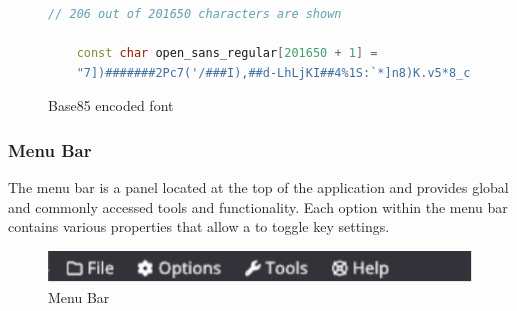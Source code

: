 \documentclass[11pt]{article}
\begin{document}
\begin{figure}[H]
  \centering
  \begin{lstlisting}[language=C++]
    // 206 out of 201650 characters are shown

    const char open_sans_regular[201650 + 1] =
    "7])#######2Pc7('/###I),##d-LhLjKI##4%1S:`*]n8)K.v5*8_c)iZ;99=$$$$c(m]4pKdp/(RdL<snZo'oI,hLNDnx4Uu/>8Q7oo^eFb3hB4JYc'Tx-3l_wgd2Tf._r+&sAqV,-G"":F8LD=5,n]A&aA+<gXG-<iobW&>$>QJ8Z.W$jg0Fv-o^(^JJnf4T"
  \end{lstlisting}
  \caption{Base85 encoded font}
  \label{fig:base85_font}
\end{figure}

\subsubsection{Menu Bar}
The menu bar is a panel located at the top of the application and provides
global and commonly accessed tools and functionality. Each option within the 
menu bar contains various properties that allow a to toggle key settings.
\begin{figure}[H]
  \centering
  \includegraphics[width=\textwidth]{images/menu_bar.png}
  \caption{Menu Bar}
  \label{fig:menu_bar}
\end{figure}
\end{document}
